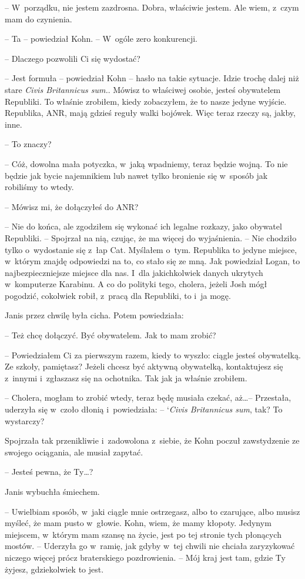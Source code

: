 \documentclass[oneside,polish,11pt,sfheadings]{mwbk}
\begin{document}
-- W~porządku, nie jestem zazdrosna. Dobra,
właściwie jestem. Ale wiem, z~czym mam do czynienia.

-- Ta -- powiedział Kohn. -- W~ogóle zero konkurencji.

-- Dlaczego pozwolili Ci się wydostać?

-- Jest formuła -- powiedział Kohn -- hasło na takie sytuacje. Idzie trochę
dalej niż stare \emph{Civis Britannicus sum.}. Mówisz to właściwej
osobie, jesteś obywatelem Republiki. To właśnie zrobiłem, kiedy
zobaczyłem, że to nasze jedyne wyjście. Republika, ANR, mają gdzieś
reguły walki bojówek. Więc teraz rzeczy są, jakby, inne.

-- To znaczy?

-- Cóż, dowolna mała potyczka, w~jaką wpadniemy, teraz będzie wojną. To
nie będzie jak bycie najemnikiem lub nawet tylko bronienie się w~sposób
jak robiliśmy to wtedy.

-- Mówisz mi, że dołączyłeś do ANR?

-- Nie do końca, ale zgodziłem się wykonać ich legalne rozkazy, jako
obywatel Republiki. -- Spojrzał na nią, czując, że ma więcej do
wyjaśnienia. -- Nie chodziło tylko o~wydostanie się z~łap Cat. Myślałem o~tym. Republika to jedyne miejsce, w~którym znajdę odpowiedzi na to, co
stało się ze mną. Jak powiedział Logan, to najbezpieczniejsze miejsce
dla nas. I~dla jakichkolwiek danych ukrytych w~komputerze Karabinu. A co
do polityki tego, cholera, jeżeli Josh mógł pogodzić, cokolwiek robił, z~pracą dla Republiki, to i~ja mogę.

Janis przez chwilę była cicha. Potem powiedziała: 

-- Też chcę dołączyć.
Być obywatelem. Jak to mam zrobić?

-- Powiedziałem Ci za pierwszym razem, kiedy to wyszło: ciągle jesteś
obywatelką. Ze szkoły, pamiętasz? Jeżeli chcesz być aktywną obywatelką,
kontaktujesz się z~innymi i~zgłaszasz się na ochotnika. Tak jak ja
właśnie zrobiłem.

-- Cholera, mogłam to zrobić wtedy, teraz będę musiała czekać, aż\ldots -- Przestała, uderzyła się w~czoło dłonią i~powiedziała: -- `\emph{Civis
Britannicus sum}, tak? To wystarczy?

Spojrzała tak przenikliwie i~zadowolona z~siebie, że Kohn poczuł
zawstydzenie ze swojego ociągania, ale musiał zapytać.

-- Jesteś pewna, że Ty\ldots?

Janis wybuchła śmiechem. 

-- Uwielbiam sposób, w~jaki ciągle mnie
ostrzegasz, albo to czarujące, albo musisz myśleć, że mam pusto w~głowie. Kohn, wiem, że mamy kłopoty. Jedynym miejscem, w~którym mam
szansę na życie, jest po tej stronie tych płonących mostów. -- Uderzyła
go w~ramię, jak gdyby w~tej chwili nie chciała zaryzykować niczego
więcej prócz braterskiego pozdrowienia. -- Mój kraj jest tam, gdzie Ty
żyjesz, gdziekolwiek to jest.
\end{document}
